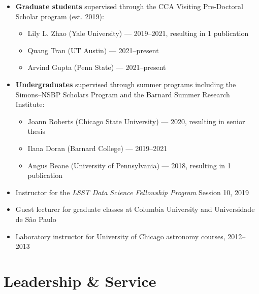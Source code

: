\documentclass{clean_cv}
\begin{document}
\begin{itemize}
    \item \textbf{Graduate students} supervised through the CCA Visiting Pre-Doctoral Scholar program (est. 2019):
    \begin{itemize}
        \item Lily L. Zhao (Yale University) --- 2019--2021, resulting in 1 publication
        \item Quang Tran (UT Austin) --- 2021--present
        \item Arvind Gupta (Penn State) --- 2021--present
    \end{itemize}
    \item \textbf{Undergraduates} supervised through summer programs including the Simons--NSBP Scholars Program and the Barnard Summer Research Institute:
    \begin{itemize}
        \item Joann Roberts (Chicago State University) --- 2020, resulting in senior thesis
        \item Ilana Doran (Barnard College) --- 2019--2021
        \item Angus Beane (University of Pennsylvania) --- 2018, resulting in 1 publication
    \end{itemize}
    \item Instructor for the \textit{LSST Data Science Fellowship Program} Session 10, 2019
    \item Guest lecturer for graduate classes at Columbia University and Universidade de S\~{a}o Paulo
    \item Laboratory instructor for University of Chicago astronomy courses, 2012--2013
\end{itemize}

\section{Leadership \& Service}
\end{document}
